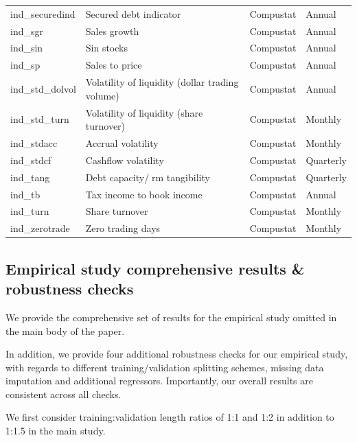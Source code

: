 \documentclass{article}
\begin{document}
\begin{center}
\begin{longtable}{llll}
			ind\_securedind & Secured debt indicator & Compustat & Annual \\
			ind\_sgr\footnotemark[\value{footnote}] & Sales growth & Compustat & Annual \\
			ind\_sin & Sin stocks & Compustat & Annual \\
			ind\_sp & Sales to price & Compustat & Annual \\
			ind\_std\_dolvol & Volatility of liquidity (dollar trading volume) & Compustat & Annual \\
			ind\_std\_turn & Volatility of liquidity (share turnover) & Compustat & Monthly \\
			ind\_stdacc\footnotemark[\value{footnote}] & Accrual volatility & Compustat & Monthly \\
			ind\_stdcf\footnotemark[\value{footnote}] & Cashflow volatility & Compustat & Quarterly \\
			ind\_tang & Debt capacity/rm tangibility & Compustat & Quarterly \\
			ind\_tb\footnotemark[\value{footnote}] & Tax income to book income & Compustat & Annual \\
			ind\_turn & Share turnover & Compustat & Monthly \\
			ind\_zerotrade & Zero trading days & Compustat & Monthly \\ \hline	
		\end{longtable}
	\end{center}
\newpage

\FloatBarrier
\subsection{Empirical study comprehensive results \& robustness checks}
We provide the comprehensive set of results for the empirical study omitted in the main body of the paper. 

In addition, we provide four additional robustness checks for our empirical study, with regards to different training/validation splitting schemes, missing data imputation and additional regressors. Importantly, our overall results are consistent across all checks.

We first consider training:validation length ratios of 1:1 and 1:2 in addition to 1:1.5 in the main study. 
\end{document}
